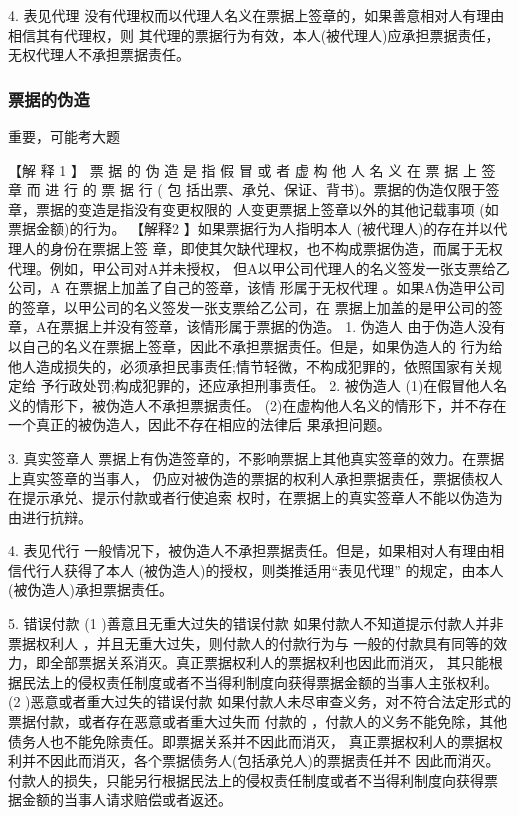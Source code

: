 \documentclass[UTF8,12pt]{ctexart}
\numberwithin{equation}{section} %
\numberwithin{figure}{section}
\numberwithin{table}{section}
\begin{document}
	4. 表见代理 没有代理权而以代理人名义在票据上签章的，如果善意相对人有理由相信其有代理权，则 其代理的票据行为有效，本人(被代理人)应承担票据责任，无权代理人不承担票据责任。
	
	\subsubsection{票据的伪造}
	重要，可能考大题
	
	【解 释 1 】 票 据 的 伪 造 是 指 假 冒 或 者 虚 构 他 人 名 义 在 票 据 上 签 章 而 进 行 的 票 据 行 ( 包 括出票、承兑、保证、背书)。票据的伪造仅限于签章，票据的变造是指没有变更权限的 人变更票据上签章以外的其他记载事项 (如票据金额)的行为。
	【解释2 】如果票据行为人指明本人 (被代理人)的存在并以代理人的身份在票据上签 章，即使其欠缺代理权，也不构成票据伪造，而属于无权代理。例如，甲公司对A并未授权， 但A以甲公司代理人的名义签发一张支票给乙公司，A 在票据上加盖了自己的签章，该情 形属于无权代理 。如果A伪造甲公司的签章，以甲公司的名义签发一张支票给乙公司，在 票据上加盖的是甲公司的签章，A在票据上并没有签章，该情形属于票据的伪造。
	1. 伪造人 由于伪造人没有以自己的名义在票据上签章，因此不承担票据责任。但是，如果伪造人的 行为给他人造成损失的，必须承担民事责任;情节轻微，不构成犯罪的，依照国家有关规定给 予行政处罚;构成犯罪的，还应承担刑事责任。
	2. 被伪造人
	(1)在假冒他人名义的情形下，被伪造人不承担票据责任。 (2)在虚构他人名义的情形下，并不存在 一个真正的被伪造人，因此不存在相应的法律后 果承担问题。
	
	
	3. 真实签章人 票据上有伪造签章的，不影响票据上其他真实签章的效力。在票据上真实签章的当事人， 仍应对被伪造的票据的权利人承担票据责任，票据债权人在提示承兑、提示付款或者行使追索 权时，在票据上的真实签章人不能以伪造为由进行抗辩。
	
	4. 表见代行 一般情况下，被伪造人不承担票据责任。但是，如果相对人有理由相信代行人获得了本人 (被伪造人)的授权，则类推适用“表见代理” 的规定，由本人(被伪造人)承担票据责任。
	
	5. 错误付款
	(1 )善意且无重大过失的错误付款
	如果付款人不知道提示付款人并非票据权利人 ，并且无重大过失，则付款人的付款行为与 一般的付款具有同等的效力，即全部票据关系消灭。真正票据权利人的票据权利也因此而消灭， 其只能根据民法上的侵权责任制度或者不当得利制度向获得票据金额的当事人主张权利。
	(2 )恶意或者重大过失的错误付款 如果付款人未尽审查义务，对不符合法定形式的票据付款，或者存在恶意或者重大过失而 付款的 ，付款人的义务不能免除，其他债务人也不能免除责任。即票据关系并不因此而消灭， 真正票据权利人的票据权利并不因此而消灭，各个票据债务人(包括承兑人)的票据责任并不 因此而消灭。付款人的损失，只能另行根据民法上的侵权责任制度或者不当得利制度向获得票 据金额的当事人请求赔偿或者返还。
	
\end{document}
